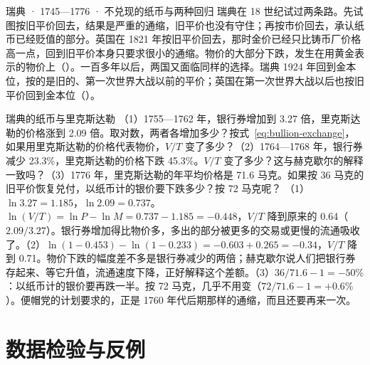 \begin{case}{瑞典 · 1745—1776 · 不兑现的纸币与两种回归}
瑞典在 18 世纪试过两条路。先试图按旧平价回去，结果是严重的通缩，旧平价也没有守住；再按市价回去，承认纸币已经贬值的部分。英国在 1821 年按旧平价回去，那时金价已经只比铸币厂价格高一点，回到旧平价本身只要求很小的通缩。物价的大部分下跌，发生在用黄金表示的物价上（）。一百多年以后，两国又面临同样的选择。瑞典 1924 年回到金本位，按的是旧的、第一次世界大战以前的平价\cite{fregert2014}；英国在第一次世界大战以后也按旧平价回到金本位（）。
\end{case}

\begin{example}{瑞典的纸币与里克斯达勒}\label{ex:bullion-sweden}
（1）1755—1762 年，银行券增加到 3.27 倍，里克斯达勒的价格涨到 2.09 倍。取对数，两者各增加多少？按式~\eqref{eq:bullion-exchange}，如果用里克斯达勒的价格代表物价，$V/T$ 变了多少？（2）1764—1768 年，银行券减少 23.3\%，里克斯达勒的价格下跌 45.3\%。$V/T$ 变了多少？这与赫克歇尔的解释一致吗？（3）1776 年，里克斯达勒的年平均价格是 71.6 马克。如果按 36 马克的旧平价恢复兑付，以纸币计的银价要下跌多少？按 72 马克呢？
\solution （1）$\ln3.27=1.185$，$\ln2.09=0.737$。$\ln(V/T)=\ln P-\ln M=0.737-1.185=-0.448$，$V/T$ 降到原来的 0.64（$2.09/3.27$）。银行券增加得比物价多，多出的部分被更多的交易或更慢的流通吸收了。（2）$\ln(1-0.453)-\ln(1-0.233)=-0.603+0.265=-0.34$，$V/T$ 降到 0.71。物价下跌的幅度差不多是银行券减少的两倍；赫克歇尔说人们把银行券存起来、等它升值，流通速度下降，正好解释这个差额。（3）$36/71.6-1=-50\%$：以纸币计的银价要再跌一半。按 72 马克，几乎不用变（$72/71.6-1=+0.6\%$）。便帽党的计划要求的，正是 1760 年代后期那样的通缩，而且还要再来一次。
\end{example}


\section{数据检验与反例}\label{sec:bullion-test}

